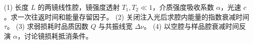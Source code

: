 (1) 长度 \(L\) 的两镜线性腔，镜强度透射 \(T_1,T_2\ll1\)，介质强度吸收系数 \(\alpha\)，光速 \(c\)。求一次往返时间和能量存留因子。
(2) 关闭注入光后求腔内能量的指数衰减时间 \(\tau\)。
(3) 求弱损耗时品质因数 \(Q\) 与共振线宽 \(\Delta\nu\)。
(4) 以空腔与样品腔衰减时间反演 \(\alpha\)，讨论镜损耗抵消条件。
